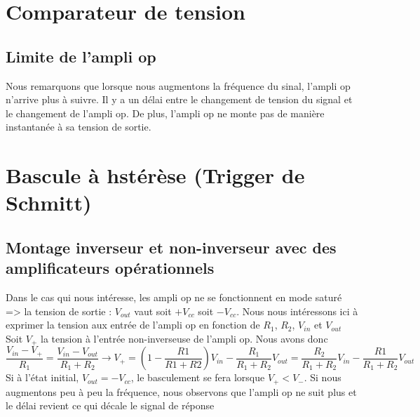 
 	\section{Comparateur de tension}
	\subsection{Limite de l'ampli op}
	Nous remarquons que lorsque nous augmentons la fréquence du sinal, l'ampli op n'arrive plus à suivre. Il y a un délai entre le changement de tension du signal et le changement de l'ampli op. De plus, l'ampli op ne monte pas de manière instantanée à sa tension de sortie. %

	\section{Bascule à hstérèse (Trigger de Schmitt)}
	\subsection{Montage inverseur et non-inverseur avec des amplificateurs opérationnels}
Dans le cas qui nous intéresse, les ampli op ne se fonctionnent en mode saturé => la tension de sortie : $V_{out}$ vaut soit $+V_{cc}$ soit $-V_{cc}$. 
Nous nous intéressons ici à exprimer la tension aux entrée de l'ampli op en fonction de $R_1$, $R_2$, $V_{in}$ et $V_{out}$
Soit $V_{+}$ la tension à l'entrée non-inverseuse de l'ampli op.
Nous avons donc
$$\frac{V_{in}-V_{+}}{R_1}=\frac{V_{in}-V_{out}}{R_1+R_2} \rightarrow V_{+}=\left(1-\frac{R1}{R1+R2}\right)V_{in}-\frac{R_1}{R_1+R_2} V_{out}=\frac{R_2}{R_1+R_2}V_{in}-\frac{R1}{R_1+R_2}V_{out}$$
Si à l'état initial, $V_{out}=-V_{cc}$, le basculement se fera lorsque $V_+ \less V_-$.  
Si nous augmentons peu à peu la fréquence, nous observons que l'ampli op ne suit plus et le délai revient ce qui décale le signal de réponse


